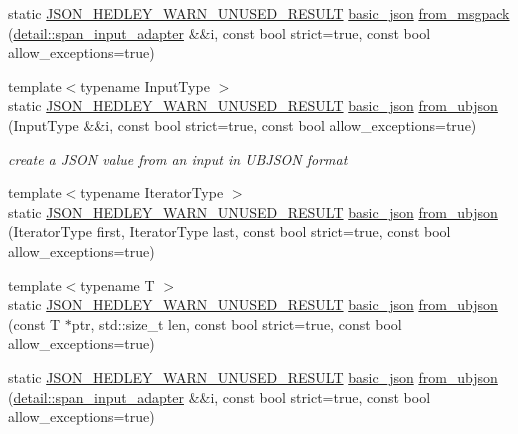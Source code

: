 \begin{DoxyCompactItemize}
\item 
static \hyperlink{json_8hpp_a28d7e3b2d26bd5b8a3806da3db7dea03}{J\+S\+O\+N\+\_\+\+H\+E\+D\+L\+E\+Y\+\_\+\+W\+A\+R\+N\+\_\+\+U\+N\+U\+S\+E\+D\+\_\+\+R\+E\+S\+U\+LT} \hyperlink{classnlohmann_1_1basic__json}{basic\+\_\+json} \hyperlink{classnlohmann_1_1basic__json_a84b3d89de8e774a2609dc4c0a1273f62}{from\+\_\+msgpack} (\hyperlink{classnlohmann_1_1detail_1_1span__input__adapter}{detail\+::span\+\_\+input\+\_\+adapter} \&\&i, const bool strict=true, const bool allow\+\_\+exceptions=true)
\item 
{\footnotesize template$<$typename Input\+Type $>$ }\\static \hyperlink{json_8hpp_a28d7e3b2d26bd5b8a3806da3db7dea03}{J\+S\+O\+N\+\_\+\+H\+E\+D\+L\+E\+Y\+\_\+\+W\+A\+R\+N\+\_\+\+U\+N\+U\+S\+E\+D\+\_\+\+R\+E\+S\+U\+LT} \hyperlink{classnlohmann_1_1basic__json}{basic\+\_\+json} \hyperlink{classnlohmann_1_1basic__json_aa81f62db69978b90ff701f05c72e03a7}{from\+\_\+ubjson} (Input\+Type \&\&i, const bool strict=true, const bool allow\+\_\+exceptions=true)
\begin{DoxyCompactList}\small\item\em create a J\+S\+ON value from an input in U\+B\+J\+S\+ON format \end{DoxyCompactList}\item 
{\footnotesize template$<$typename Iterator\+Type $>$ }\\static \hyperlink{json_8hpp_a28d7e3b2d26bd5b8a3806da3db7dea03}{J\+S\+O\+N\+\_\+\+H\+E\+D\+L\+E\+Y\+\_\+\+W\+A\+R\+N\+\_\+\+U\+N\+U\+S\+E\+D\+\_\+\+R\+E\+S\+U\+LT} \hyperlink{classnlohmann_1_1basic__json}{basic\+\_\+json} \hyperlink{classnlohmann_1_1basic__json_a9dbb422350fed520ce8c1ca8762c0251}{from\+\_\+ubjson} (Iterator\+Type first, Iterator\+Type last, const bool strict=true, const bool allow\+\_\+exceptions=true)
\item 
{\footnotesize template$<$typename T $>$ }\\static \hyperlink{json_8hpp_a28d7e3b2d26bd5b8a3806da3db7dea03}{J\+S\+O\+N\+\_\+\+H\+E\+D\+L\+E\+Y\+\_\+\+W\+A\+R\+N\+\_\+\+U\+N\+U\+S\+E\+D\+\_\+\+R\+E\+S\+U\+LT} \hyperlink{classnlohmann_1_1basic__json}{basic\+\_\+json} \hyperlink{classnlohmann_1_1basic__json_ab6eeda23c34cee79d8d72f1a8691a8de}{from\+\_\+ubjson} (const T $\ast$ptr, std\+::size\+\_\+t len, const bool strict=true, const bool allow\+\_\+exceptions=true)
\item 
static \hyperlink{json_8hpp_a28d7e3b2d26bd5b8a3806da3db7dea03}{J\+S\+O\+N\+\_\+\+H\+E\+D\+L\+E\+Y\+\_\+\+W\+A\+R\+N\+\_\+\+U\+N\+U\+S\+E\+D\+\_\+\+R\+E\+S\+U\+LT} \hyperlink{classnlohmann_1_1basic__json}{basic\+\_\+json} \hyperlink{classnlohmann_1_1basic__json_a47201396899371881a46562bffb922da}{from\+\_\+ubjson} (\hyperlink{classnlohmann_1_1detail_1_1span__input__adapter}{detail\+::span\+\_\+input\+\_\+adapter} \&\&i, const bool strict=true, const bool allow\+\_\+exceptions=true)

\end{DoxyCompactItemize}

